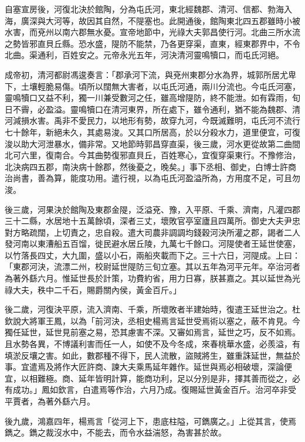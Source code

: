 \begin{pinyinscope}
自塞宣房後，河復北決於館陶，分為屯氏河，東北經魏郡、清河、信都、勃海入海，廣深與大河等，故因其自然，不隄塞也。此開通後，館陶東北四五郡雖時小被水害，而兗州以南六郡無水憂。宣帝地節中，光祿大夫郭昌使行河。北曲三所水流之勢皆邪直貝丘縣。恐水盛，隄防不能禁，乃各更穿渠，直東，經東郡界中，不令北曲。渠通利，百姓安之。元帝永光五年，河決清河靈鳴犢口，而屯氏河絕。

成帝初，清河都尉馮逡奏言：「郡承河下流，與兗州東郡分水為界，城郭所居尤卑下，土壤輕脆易傷。頃所以闊無大害者，以屯氏河通，兩川分流也。今屯氏河塞，靈鳴犢口又益不利，獨一川兼受數河之任，雖高增隄防，終不能泄。如有霖雨，旬日不霽，必盈溢。靈鳴犢口在清河東界，所在處下，雖令通利，猶不能為魏郡、清河減損水害。禹非不愛民力，以地形有勢，故穿九河，今既滅難明，屯氏河不流行七十餘年，新絕未久，其處易浚。又其口所居高，於以分殺水力，道里便宜，可復浚以助大河泄暴水，備非常。又地節時郭昌穿直渠，後三歲，河水更從故第二曲間北可六里，復南合。今其曲勢復邪直貝丘，百姓寒心，宜復穿渠東行。不豫修治，北決病四五郡，南決病十餘郡，然後憂之，晚矣。」事下丞相、御史，白博士許商治尚書，善為算，能度功用。遣行視，以為屯氏河盈溢所為，方用度不足，可且勿浚。

後三歲，河果決於館陶及東郡金隄，泛溢兗、豫，入平原、千乘、濟南，凡灌四郡三十二縣，水居地十五萬餘頃，深者三丈，壞敗官亭室廬且四萬所。御史大夫尹忠對方略疏闊，上切責之，忠自殺。遣大司農非調調均錢穀河決所灌之郡，謁者二人發河南以東漕船五百馏，徙民避水居丘陵，九萬七千餘口。河隄使者王延世使塞，以竹落長四丈，大九圍，盛以小石，兩船夾載而下之。三十六日，河隄成。上曰：「東郡河決，流漂二州，校尉延世隄防三旬立塞。其以五年為河平元年。卒治河者為著外繇六月。惟延世長於計策，功費約省，用力日寡，朕甚嘉之。其以延世為光祿大夫，秩中二千石，賜爵關內侯，黃金百斤。」

後二歲，河復決平原，流入濟南、千乘，所壞敗者半建始時，復遣王延世治之。杜欽說大將軍王鳳，以為「前河決，丞相史楊焉言延世受焉術以塞之，蔽不肯見。今獨任延世，延世見前塞之易，恐其慮害不深。又審如焉言，延世之巧，反不如焉。且水勢各異，不博議利害而任一人，如使不及今冬成，來春桃華水盛，必羨溢，有填淤反壤之害。如此，數郡種不得下，民人流散，盜賊將生，雖重誅延世，無益於事。宜遣焉及將作大匠許商、諫大夫乘馬延年雜作。延世與焉必相破壞，深論便宜，以相難極。商、延年皆明計算，能商功利，足以分別是非，擇其善而從之，必有成功。」鳳如欽言，白遣焉等作治，六月乃成。復賜延世黃金百斤。治河卒非受平賈者，為著外繇六月。

後九歲，鴻嘉四年，楊焉言「從河上下，患底柱隘，可鐫廣之。」上從其言，使焉鐫之。鐫之裁沒水中，不能去，而令水益湍怒，為害甚於故。


\end{pinyinscope}
